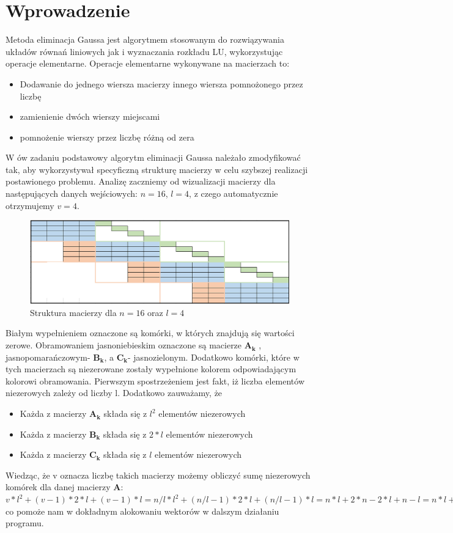 \documentclass[a4paper,14pt]{report}
\begin{document}
  \section{Wprowadzenie}
  Metoda eliminacja Gaussa jest algorytmem stosowanym do rozwiązywania układów równań liniowych jak i wyznaczania rozkładu LU, wykorzystując operacje elementarne. Operacje elementarne wykonywane na macierzach to:
  \begin{itemize}
    \item Dodawanie do jednego wiersza macierzy innego wiersza pomnożonego przez liczbę
    \item zamienienie dwóch wierszy miejscami
    \item pomnożenie wierszy przez liczbę różną od zera
  \end{itemize}
  W ów zadaniu podstawowy algorytm eliminacji Gaussa należało zmodyfikować tak, aby wykorzystywał specyficzną strukturę macierzy w celu szybszej realizacji postawionego problemu. Analizę zaczniemy od wizualizacji macierzy dla następujących danych wejściowych: $n=16$, $l=4$, z czego automatycznie otrzymujemy $v=4$.
  \begin{figure}[H]
      \includegraphics[scale=0.5]{macierz}
      \centering
      \caption{Struktura macierzy dla $n=16$ oraz $l=4$}
    \end{figure}
  Białym wypełnieniem oznaczone są komórki, w których znajdują się wartości zerowe. Obramowaniem jasnoniebieskim oznaczone są macierze $\mathbf{A_{k}}$
, jasnopomarańczowym- $\mathbf{B_{k}}$, a $\mathbf{C_{k}}$- jasnozielonym. Dodatkowo komórki, które w tych macierzach są niezerowane zostały wypełnione kolorem odpowiadającym kolorowi obramowania.
  Pierwszym spostrzeżeniem jest fakt, iż liczba elementów niezerowych zależy od liczby l. Dodatkowo zauważamy, że
  \begin{itemize}
    \item Każda z macierzy $\mathbf{A_{k}}$ składa się z $l^{2}$ elementów niezerowych 
    \item Każda z macierzy $\mathbf{B_{k}}$ składa się z $2*l$ elementów niezerowych
    \item Każda z macierzy $\mathbf{C_{k}}$ składa się z $l$ elementów niezerowych
  \end{itemize}
  Wiedząc, że v oznacza liczbę takich macierzy możemy obliczyć sumę niezerowych komórek dla danej macierzy \textbf{A}:
  $v*l^{2}+(v-1)*2*l+(v-1)*l=n/l*l^{2}+(n/l-1)*2*l+(n/l-1)*l=n*l+2*n-2*l+n-l=n*l+3*n-3*l=n*l+3(n-l)$ co pomoże nam w dokładnym alokowaniu wektorów w dalszym działaniu programu.
\end{document}
